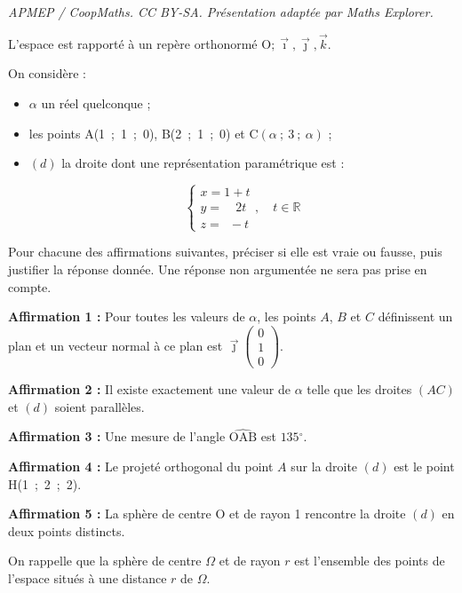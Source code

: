 \documentclass[10pt]{article}
\providecommand{\degres}{\ensuremath{^\circ}}
\providecommand{\vect}[1]{\overrightarrow{#1}}
\providecommand{\degres}{{^\circ}}
\providecommand{\Oijk}{\(\mathrm{O};\vec{\imath},\vec{\jmath},\vec{k}\)}
\begin{document}
\noindent\textit{APMEP / CoopMaths. CC BY-SA. Présentation adaptée par Maths Explorer.}\par\medskip
L'espace est rapporté à un repère orthonormé \Oijk.

On considère :

\begin{itemize}
\item $\alpha$ un réel quelconque ;
\item les points A(1~;~1~;~0), B(2~;~1~;~0) et C$(\alpha~;~3~;~\alpha)$ ;
\item $(d)$ la droite dont une représentation paramétrique est :

\[
\left\{
\begin{array}{l}
x = 1 + t\\
y = \phantom{11} 2t\\
z = \phantom{1}- t
\end{array}
\right., \quad t \in \mathbb{R}
\]
\end{itemize}

Pour chacune des affirmations suivantes, préciser si elle est vraie ou fausse, puis justifier la réponse donnée. Une réponse non argumentée ne sera pas prise en compte.

\textbf{Affirmation 1 :} Pour toutes les valeurs de $\alpha$, les points $A$, $B$ et $C$ définissent un plan et un vecteur normal à ce plan est $\vect{\jmath}\begin{pmatrix}0\\1\\0\end{pmatrix}$.

\textbf{Affirmation 2 :} Il existe exactement une valeur de $\alpha$ telle que les droites $(AC)$ et $(d)$ soient parallèles.

\textbf{Affirmation 3 :} Une mesure de l'angle $\widehat{\text{OAB}}$ est $135\degres$.

\textbf{Affirmation 4 :} Le projeté orthogonal du point $A$ sur la droite $(d)$ est le point H(1~;~2~;~2).

\textbf{Affirmation 5 :} La sphère de centre O et de rayon 1 rencontre la droite $(d)$ en deux points distincts.

On rappelle que la sphère de centre $\Omega$
et de rayon $r$ est l'ensemble des points de l'espace situés à une distance $r$ de $\Omega$.
\end{document}
